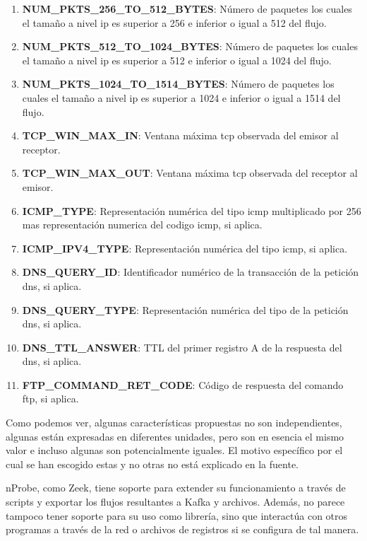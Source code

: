 \begin{enumerate}
    \item \textbf{NUM\_PKTS\_256\_TO\_512\_BYTES}: Número de paquetes los cuales el tamaño a nivel \acrshort{ip} es superior a 256 e inferior o igual a 512 del flujo.
    \item \textbf{NUM\_PKTS\_512\_TO\_1024\_BYTES}: Número de paquetes los cuales el tamaño a nivel \acrshort{ip} es superior a 512 e inferior o igual a 1024 del flujo.
    \item \textbf{NUM\_PKTS\_1024\_TO\_1514\_BYTES}: Número de paquetes los cuales el tamaño a nivel \acrshort{ip} es superior a 1024 e inferior o igual a 1514 del flujo.
    \item \textbf{TCP\_WIN\_MAX\_IN}: Ventana máxima \acrshort{tcp} observada del emisor al receptor.
    \item \textbf{TCP\_WIN\_MAX\_OUT}: Ventana máxima \acrshort{tcp} observada del receptor al emisor.
    \item \textbf{ICMP\_TYPE}: Representación numérica del tipo \acrshort{icmp} multiplicado por 256 mas representación numerica del codigo  \acrshort{icmp}, si aplica.
    \item \textbf{ICMP\_IPV4\_TYPE}: Representación numérica del tipo \acrshort{icmp}, si aplica.
    \item \textbf{DNS\_QUERY\_ID}: Identificador numérico de la transacción de la petición \acrshort{dns}, si aplica.
    \item \textbf{DNS\_QUERY\_TYPE}: Representación numérica del tipo de la petición \acrshort{dns}, si aplica.
    \item \textbf{DNS\_TTL\_ANSWER}: TTL del primer registro A de la respuesta del \acrshort{dns}, si aplica.
    \item \textbf{FTP\_COMMAND\_RET\_CODE}: Código de respuesta del comando \acrshort{ftp}, si aplica.
\end{enumerate}

Como podemos ver, algunas características propuestas no son independientes, algunas están expresadas en diferentes unidades, pero son en esencia el mismo valor e incluso algunas son potencialmente iguales. El motivo específico por el cual se han escogido estas y no otras no está explicado en la fuente.

nProbe, como Zeek, tiene soporte para extender su funcionamiento a través de scripts y exportar los flujos resultantes a Kafka y archivos. Además, no parece tampoco tener soporte para su uso como librería, sino que interactúa con otros programas a través de la red o archivos de registros si se configura de tal manera.
